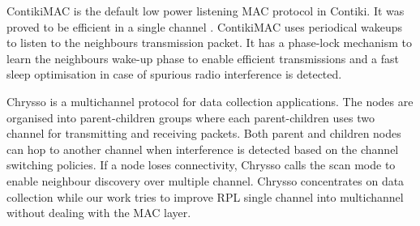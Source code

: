 
ContikiMAC \cite{contikimac} is the default low power listening MAC protocol in Contiki. It was proved to be efficient in a single channel \cite{micmac}\cite{orpl}. ContikiMAC uses periodical wakeups to listen to the neighbours transmission packet. It has a phase-lock mechanism to learn the neighbours wake-up phase to enable efficient transmissions and a fast sleep optimisation in case of spurious radio interference is detected.






Chrysso \cite{chrysso} is a multichannel protocol for data collection applications. The nodes are organised into parent-children groups where each parent-children uses two channel for transmitting and receiving packets. Both parent and children nodes can hop to another channel when interference is detected based on the channel switching policies. If a node loses connectivity, Chrysso calls the scan mode to enable neighbour discovery over multiple channel. Chrysso concentrates on data collection while our work tries to improve RPL single channel into multichannel without dealing with the MAC layer. 

